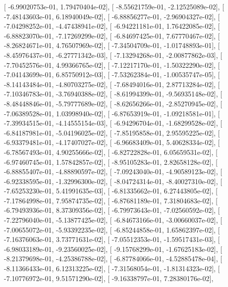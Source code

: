 \documentclass{article}
\begin{document}
       [ -6.99020753e-01,   1.79470404e-02],
       [ -8.55621759e-01,  -2.12525089e-02],
       [ -7.48143603e-01,   6.18940049e-02],
       [ -6.88856277e-01,  -2.96904327e-02],
       [ -7.04298252e-01,  -4.47438941e-02],
       [ -6.94221181e-01,   1.76422085e-02],
       [ -6.88823070e-01,  -7.17269299e-02],
       [ -6.84697425e-01,   7.67770467e-02],
       [ -8.26824671e-01,   4.76507969e-02],
       [ -7.34504709e-01,  -1.01748893e-01],
       [ -8.45976437e-01,  -6.27771342e-03],
       [ -7.13294268e-01,  -2.00877862e-03],
       [ -7.70452576e-01,   4.99366765e-02],
       [ -7.12217170e-01,  -1.50322290e-02],
       [ -7.04143699e-01,   6.85750912e-03],
       [ -7.53262384e-01,  -1.00535747e-05],
       [ -8.14143484e-01,  -4.80703275e-02],
       [ -7.68494016e-01,   2.87713284e-02],
       [ -7.10346783e-01,  -3.76940388e-02],
       [ -8.61994399e-01,  -9.56935148e-02],
       [ -8.48448846e-01,  -5.79777689e-02],
       [ -8.62656266e-01,  -2.85270945e-02],
       [ -7.06389528e-01,   1.03998940e-02],
       [ -6.87653919e-01,  -1.09218581e-01],
       [ -7.39934515e-01,  -4.14555154e-03],
       [ -6.94296704e-01,  -1.68299528e-02],
       [ -6.84187981e-01,  -5.04196025e-02],
       [ -7.85195858e-01,   2.95595225e-02],
       [ -6.93379481e-01,  -4.17407027e-02],
       [ -6.96683409e-01,   5.40628334e-02],
       [ -6.78567493e-01,   4.90255666e-02],
       [ -6.82722828e-01,   6.05659531e-02],
       [ -6.97460745e-01,   1.57842857e-02],
       [ -8.95105283e-01,   2.82658128e-02],
       [ -6.88855407e-01,  -4.88890597e-02],
       [ -7.09243040e-01,  -4.90589123e-02],
       [ -6.92338595e-01,  -1.32996300e-02],
       [ -8.04724314e-01,  -8.40027310e-02],
       [ -7.65253230e-01,   5.41991635e-03],
       [ -6.81335662e-01,   6.27443805e-02],
       [ -7.17864998e-01,   7.95874735e-02],
       [ -6.87681189e-01,   7.31804683e-02],
       [ -6.79493936e-01,   8.37309356e-02],
       [ -6.79973643e-01,  -7.02560592e-02],
       [ -7.22796040e-01,  -5.13877425e-02],
       [ -6.84673166e-01,  -3.00660037e-02],
       [ -7.00655072e-01,  -5.93392235e-02],
       [ -6.85244858e-01,   1.65862397e-02],
       [ -7.16376063e-01,   3.73771631e-02],
       [ -7.05512353e-01,  -1.59517431e-03],
       [ -6.98033189e-01,  -9.23560025e-02],
       [ -9.15768299e-01,  -1.67625183e-02],
       [ -8.21379698e-01,  -4.25386788e-02],
       [ -6.87784066e-01,  -4.52885478e-04],
       [ -8.11366433e-01,   6.12313225e-02],
       [ -7.31568054e-01,  -1.81314323e-02],
       [ -7.10776972e-01,   9.51571290e-02],
       [ -9.16338797e-01,   7.28380176e-02],
\end{document}
